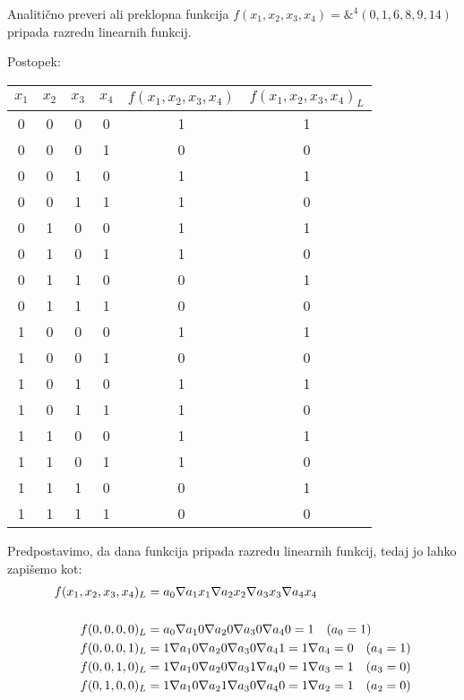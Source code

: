 \begin{zgled}
Analitično preveri ali preklopna funkcija $f(x_1,x_2,x_3,x_4)=\&^4(0,1,6,8,9,14)$ pripada razredu linearnih funkcij.\\
\end{zgled}
\begin{resitev}
Postopek:

\begin{table}[ht]
\centering
\begin{tabular}{cccc|c|c}
$x_1$ & $x_2$ & $x_3$ & $x_4$ & $f(x_1,x_2,x_3,x_4)$ & $f(x_1,x_2,x_3,x_4)_L$\\
\hline
0 & 0 & 0 & 0 & 1 & 1\\
0 & 0 & 0 & 1 & 0 & 0\\
0 & 0 & 1 & 0 & 1 & 1\\
0 & 0 & 1 & 1 & 1 & 0\\
0 & 1 & 0 & 0 & 1 & 1\\
0 & 1 & 0 & 1 & 1 & 0\\
0 & 1 & 1 & 0 & 0 & 1\\
0 & 1 & 1 & 1 & 0 & 0\\
1 & 0 & 0 & 0 & 1 & 1\\
1 & 0 & 0 & 1 & 0 & 0\\
1 & 0 & 1 & 0 & 1 & 1\\
1 & 0 & 1 & 1 & 1 & 0\\
1 & 1 & 0 & 0 & 1 & 1\\
1 & 1 & 0 & 1 & 1 & 0\\
1 & 1 & 1 & 0 & 0 & 1\\
1 & 1 & 1 & 1 & 0 & 0\\
\end{tabular}
\end{table}
Predpostavimo, da dana funkcija pripada razredu linearnih funkcij, tedaj jo lahko zapišemo kot:
\begin{align*}
f(x_1,x_2,x_3,x_4)_L & = a_0 \nabla a_1 x_1 \nabla a_2 x_2 \nabla a_3 x_3 \nabla a_4 x_4\\
\hspace{5mm}\\
f(0,0,0,0)_L & = a_0 \nabla a_1 0 \nabla a_2 0 \nabla a_3 0 \nabla a_4 0 = 1 \quad (a_0 = 1)\\
f(0,0,0,1)_L & = 1 \nabla a_1 0 \nabla a_2 0 \nabla a_3 0 \nabla a_4 1 = 1 \nabla a_4 = 0 \quad (a_4 = 1)\\
f(0,0,1,0)_L & = 1 \nabla a_1 0 \nabla a_2 0 \nabla a_3 1 \nabla a_4 0 = 1 \nabla a_3 = 1 \quad (a_3 = 0)\\
f(0,1,0,0)_L & = 1 \nabla a_1 0 \nabla a_2 1 \nabla a_3 0 \nabla a_4 0 = 1 \nabla a_2 = 1 \quad (a_2 = 0)\\

\end{align*}
\end{resitev}
